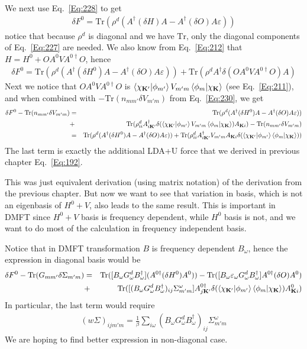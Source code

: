 \documentclass[aps,prb,floatfix,epsfig,singlecolumn,showpacs,preprintnumbers]{revtex4}
\newcommand{\vK}{{\mathbf{K}}}
\newcommand{\Tr}{\mathrm{Tr}}
\begin{document}
We next use Eq.~\ref{Eq:228} to get
\begin{eqnarray}
\delta F^0 = \Tr(\rho^d (A^{\dagger}(\delta H) A - A^{\dagger} (\delta O) A \varepsilon))
\end{eqnarray}
notice that because $\rho^d$ is diagonal and we have $\Tr$, only the
diagonal components of Eq.~\ref{Eq:227} are needed.
We also know from Eq.~\ref{Eq:212}  that $H=H^0+O A^0 V A^{0\dagger} O$, hence
\begin{eqnarray}
\delta F^0 = \Tr(\rho^d (A^{\dagger}(\delta H^0) A - A^{\dagger}  (\delta O) A \varepsilon)) + \Tr(\rho^d A^\dagger \delta(O A^0 V A^{0\dagger} O)A)
\label{Eq:237}
\end{eqnarray}
Next we notice that $ O A^0 V A^{0\dagger} O$ is $\braket{\chi_{\vK'}|\phi_{m'}}V_{m'm}\braket{\phi_m|\chi_\vK}$ (see
Eq.~\ref{Eq:211}), and when combined with $-\Tr(n_{mm'} \delta V_{m'm})$ from Eq.~\ref{Eq:230}, we get
\begin{eqnarray}
\delta F^0 -\Tr(n_{mm'} \delta V_{m'm})&=& \Tr(\rho^d
  (A^{\dagger}(\delta H^0) A - A^{\dagger}  (\delta O) A \varepsilon))\\
 &+& \Tr(\rho^d_{ii} A^\dagger_{i\vK'}  \delta(\braket{\chi_{\vK'}|\phi_{m'}}V_{m'm}\braket{\phi_m|\chi_\vK})A_{\vK  i})-\Tr(n_{mm'} \delta V_{m'm})\\
 &=& \Tr(\rho^d (A^{\dagger}(\delta H^0) A - A^{\dagger}  (\delta O) A  \varepsilon)) + 
\Tr(\rho^d_{ii} A^\dagger_{i\vK'}  V_{m'm} A_{\vK  i}\delta(\braket{\chi_{\vK'}|\phi_{m'}}\braket{\phi_m|\chi_\vK}))
\end{eqnarray}
The last term is exactly the additional LDA+U force that we derived in
previous chapter Eq.~\ref{Eq:192}.

This was just equivalent derivation (using matrix notation) of the
derivation from the previous chapter. But now we want to see that
variation in basis, which is not an eigenbasis of $H^0+V$, also leads
to the same result. This is important in DMFT since $H^0+V$ basis is
frequency dependent, while $H^0$ basis is not, and we want to do most
of the calculation in frequency independent basis.

Notice that in DMFT transformation $B$ is frequency dependent
$B_\omega$, hence the expression in diagonal basis would be
\begin{eqnarray}
\delta F^0 -\Tr(G_{mm'} \delta \Sigma_{m'm})&=& 
   \Tr( [B_\omega G^d_\omega B_\omega^\dagger]  (A^{0\dagger}(\delta H^0) A^0 )) 
- \Tr( [B_\omega \varepsilon_\omega G^d_\omega B^\dagger_\omega]  A^{0\dagger}  (\delta O) A^0 )
\nonumber\\
 &+& 
\Tr([(B_\omega G^d_\omega B^\dagger_\omega)_{ij}\Sigma^\omega_{m'm} ] A^{0\dagger}_{j\vK'}  \delta(\braket{\chi_{\vK'}|\phi_{m'}}\braket{\phi_m|\chi_\vK})A^0_{\vK  i} )
\nonumber
\end{eqnarray}
In particular, the last term would require
\begin{eqnarray}
(w\Sigma)_{ijm'm}= \frac{1}{\beta}\sum_{i\omega}  (B_\omega G^d_\omega B^\dagger_\omega)_{ij}\Sigma^\omega_{m'm} 
\end{eqnarray}
We are hoping to find better expression in non-diagonal case.
\end{document}
